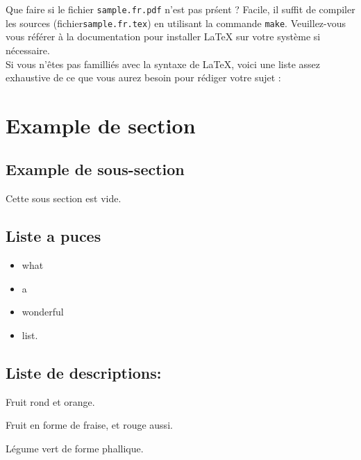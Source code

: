 \documentclass{42-fr}
\begin{document}
    Que faire si le fichier \texttt{sample.fr.pdf} n'est pas pr\'sent
    ? Facile, il suffit de compiler les sources
    (fichier\texttt{sample.fr.tex}) en utilisant la commande
    \texttt{make}. Veuillez-vous vous r\'ef\'erer \`a la documentation
    pour installer LaTeX sur votre syst\`eme si n\'ecessaire.\\

    Si vous n'\^etes pas familli\'es avec la syntaxe de LaTeX, voici
    une liste assez exhaustive de ce que vous aurez besoin pour
    r\'ediger votre sujet :\\

    \section{Example de section}


        \subsection{Example de sous-section}

            Cette sous section est vide.


        \newpage


        \subsection{Liste a puces}

            \begin{itemize}\itemsep1pt
                \item what
                \item a
                \item wonderful
                \item list.\\
            \end{itemize}


        \subsection{Liste de descriptions:}

            \begin{description}\itemsep3pt
                \item [Orange :] Fruit rond et orange.
                \item [Fraise :] Fruit en forme de fraise, et rouge aussi.
                \item [Concombre :] L\'egume vert de forme phallique.\\
            \end{description}
\end{document}
